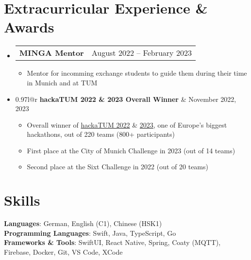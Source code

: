 \documentclass[letterpaper,11pt]{article}
\makeatletter
\newcommand{\resumeItem}[1]{
  \item\small{
    {#1 \vspace{-2pt}}
  }
}
\newcommand{\resumeProjectHeading}[2]{
    \item
    \begin{tabular*}{0.97\textwidth}{l@{\extracolsep{\fill}}r}
      \small#1 & #2 \\
    \end{tabular*}\vspace{-7pt}
}
\newcommand{\resumeSubHeadingListStart}{\begin{itemize}[leftmargin=0.15in, label={}]}
\newcommand{\resumeSubHeadingListEnd}{\end{itemize}}
\newcommand{\resumeItemListStart}{\begin{itemize}}
\newcommand{\resumeItemListEnd}{\end{itemize}\vspace{-5pt}}
\makeatother
\begin{document}
\section{Extracurricular Experience \& Awards}
\resumeSubHeadingListStart
  \resumeProjectHeading
    {\textbf{MINGA Mentor} }{August 2022 -- February 2023}
    \resumeItemListStart
      \resumeItem{Mentor for incomming exchange students to guide them during their time in Munich and at TUM}
    \resumeItemListEnd
  \resumeProjectHeading
    {\textbf{hackaTUM 2022 & 2023 Overall Winner}}{November 2022, 2023}
    \resumeItemListStart
      \resumeItem{Overall winner of \href{https://devpost.com/software/sixtcharge}{hackaTUM 2022} & \href{https://devpost.com/software/hackatum-23-munich}{2023}, one of Europe's biggest hackathons, out of 220 teams (800+ participants)}
      \resumeItem{First place at the City of Munich Challenge in 2023 (out of 14 teams)}
      \resumeItem{Second place at the Sixt Challenge in 2022 (out of 20 teams)}
    \resumeItemListEnd
\resumeSubHeadingListEnd

\section{Skills}
 \begin{itemize}[leftmargin=0.15in, label={}]
    \small{\item{
     \textbf{Languages}{: German, English (C1), Chinese (HSK1)} \\
     \textbf{Programming Languages}{: Swift, Java, TypeScript, Go} \\
     \textbf{Frameworks \& Tools}{: SwiftUI, React Native, Spring, Coaty (MQTT), Firebase, Docker, Git, VS Code, XCode } \\
    }}
 \end{itemize}

\end{document}
